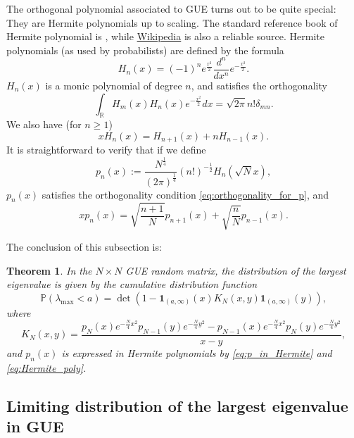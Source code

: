 \documentclass[11pt, a4paper]{article}
\numberwithin{equation}{section}
\newcommand{\id}{\mathbf{1}}
\newcommand{\realR}{\mathbb{R}}
\newcommand{\Prob}{\mathbb{P}}
\newtheorem{thm}{Theorem}
\theoremstyle{definition}
\theoremstyle{remark}
\begin{document}
The orthogonal polynomial associated to GUE turns out to be quite special: They are Hermite polynomials up to scaling. The standard reference book of Hermite polynomial is \cite{Szego75}, while \href{http://en.wikipedia.org/wiki/Hermite_polynomials}{Wikipedia} is also a reliable source. Hermite polynomials (as used by probabilists) are defined by the formula
\begin{equation} \label{eq:Hermite_poly}
  H_n(x) = (-1)^n e^{\frac{x^2}{2}} \frac{d^n}{dx^n} e^{-\frac{x^2}{2}}.
\end{equation}
$H_n(x)$ is a monic polynomial of degree $n$, and satisfies the orthogonality
\begin{equation}
  \int_{\realR} H_m(x) H_n(x) e^{-\frac{x^2}{2}} dx = \sqrt{2\pi} n! \delta_{mn}.
\end{equation}
We also have (for $n \geq 1$)
\begin{equation}
  xH_n(x) = H_{n + 1}(x) + n H_{n - 1}(x).
\end{equation}
It is straightforward to verify that if we define
\begin{equation} \label{eq:p_in_Hermite}
  p_n(x) := \frac{N^{\frac{1}{4}}}{(2\pi)^{\frac{1}{4}}} (n!)^{-\frac{1}{2}} H_n(\sqrt{N} x),
\end{equation}
$p_n(x)$ satisfies the orthogonality condition \eqref{eq:orthogonality_for_p}, and
\begin{equation}
  xp_n(x) = \sqrt{\frac{n + 1}{N}} p_{n + 1}(x) + \sqrt{\frac{n}{N}} p_{n - 1}(x).
\end{equation}

The conclusion of this subsection is:
\begin{thm}
  In the $N \times N$ GUE random matrix, the distribution of the largest eigenvalue is given by the cumulative distribution function
  \begin{equation} \label{eq:gap_prob_GUE_edge}
    \Prob(\lambda_{\max} < a) = \det(1 - \id_{(a, \infty)}(x) K_N(x, y) \id_{(a, \infty)}(y)),
  \end{equation}
  where
  \begin{equation} \label{eq:GUE_maximum}
    K_N(x, y) = \frac{p_N(x)e^{-\frac{N}{4}x^2} p_{N - 1}(y)e^{-\frac{N}{4}y^2} - p_{N - 1}(x)e^{-\frac{N}{4}x^2} p_N(y)e^{-\frac{N}{4}y^2}}{x - y},
  \end{equation}
  and $p_n(x)$ is expressed in Hermite polynomials by \eqref{eq:p_in_Hermite} and \eqref{eq:Hermite_poly}.
\end{thm}

\subsection{Limiting distribution of the largest eigenvalue in GUE}
\end{document}
